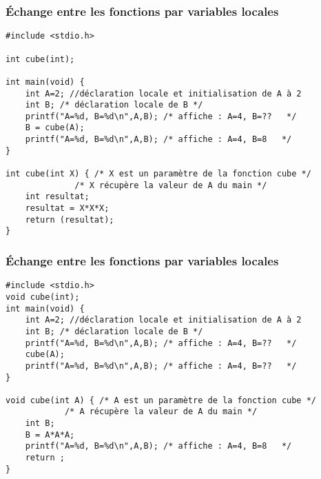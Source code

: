 \documentclass{beamer}
\begin{document}
\begin{frame}[fragile]
\frametitle{Échange entre les fonctions par variables locales}

\begin{verbatim}
#include <stdio.h> 

int cube(int);

int main(void) {
    int A=2; //déclaration locale et initialisation de A à 2
    int B; /* déclaration locale de B */
    printf("A=%d, B=%d\n",A,B);	/* affiche : A=4, B=??   */
    B = cube(A);
    printf("A=%d, B=%d\n",A,B);	/* affiche : A=4, B=8   */	
}

int cube(int X) { /* X est un paramètre de la fonction cube */
              /* X récupère la valeur de A du main */
	int resultat;		
    resultat = X*X*X;
    return (resultat);
}
\end{verbatim}

\end{frame}

\begin{frame}[fragile]
\frametitle{Échange entre les fonctions par variables locales}

\begin{verbatim}
#include <stdio.h> 
void cube(int);
int main(void) {
    int A=2; //déclaration locale et initialisation de A à 2
    int B; /* déclaration locale de B */
    printf("A=%d, B=%d\n",A,B);	/* affiche : A=4, B=??   */
    cube(A);
    printf("A=%d, B=%d\n",A,B);	/* affiche : A=4, B=??   */	
}

void cube(int A) { /* A est un paramètre de la fonction cube */
			/* A récupère la valeur de A du main */
	int B;		
	B = A*A*A;
	printf("A=%d, B=%d\n",A,B);	/* affiche : A=4, B=8   */	
	return ;
}
\end{verbatim}

\end{frame}
\end{document}
